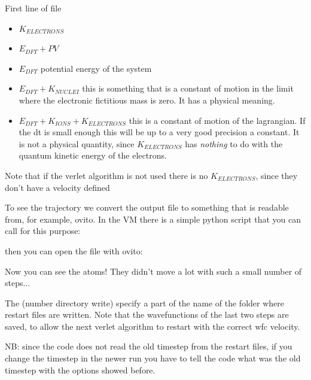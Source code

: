 \documentclass[landscape]{foils}
\begin{document}
First line of file
\begin{itemize}
	\item {} $K_{ELECTRONS}$
	\item {} $E_{DFT}+PV$ 
	\item {} $E_{DFT}$ potential energy of the system
	\item {} $E_{DFT} + K_{NUCLEI}$ this is something that is a constant of motion in the limit where the electronic fictitious mass is zero. It has a physical meaning.
	\item {} $E_{DFT} + K_{IONS} + K_{ELECTRONS}$ this is a constant of motion of the lagrangian. If the dt is small enough this will be up to a very good precision a constant. It is not a physical quantity, since $K_{ELECTRONS}$ has \emph{nothing} to do with the quantum kinetic energy of the electrons.
\end{itemize}

Note that if the verlet algorithm is not used there is no $K_{ELECTRONS}$, since they don't have a velocity defined

To see the trajectory we convert the output file to something that is readable from, for example, ovito. In the VM there is a simple python script that you can call for this purpose:


then you can open the file  with ovito:


Now you can see the atoms! They didn't move a lot with such a small number of steps...

The  (number directory write) specify a part of the name of the folder where restart files are written. Note that the wavefunctions of the last two steps are saved, to allow the next verlet algorithm to restart with the correct wfc velocity.

NB: since the code does not read the old timestep from the restart files, if you change the timestep in the newer run you have to tell the code what was the old timestep with the options showed before.
\end{document}
